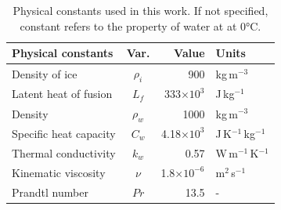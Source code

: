 \begin{table}[H]
\centering
\caption{Physical constants used in this work.  If not specified, constant refers to the property of water at at 0°C.}
\begin{tabular}{l c r l}
\hline
\textbf{Physical constants} & \textbf{Var.} & \textbf{Value} & \textbf{Units}\\
\hline
Density of ice &  $\rho_i$ & 900& kg\,m$^{-3}$ \\
Latent heat of fusion & $L_f$ & 333$\times10^3$ & J\,kg$^{-1}$\\
Density &  $\rho_w$ & 1000 & kg\,m$^{-3}$ \\
Specific heat capacity & $C_w$ & 4.18$\times10^3$ & J\,K$^{-1}$\,kg$^{-1}$\\
Thermal conductivity & $k_w$ & 0.57 & W\,m$^{-1}$\,K$^{-1}$\\
Kinematic viscosity  & $\nu$ & 1.8$\times10^{-6}$ & m$^2$\,s$^{-1}$\\
Prandtl number & $Pr$ & 13.5 & -\\

\hline
\end{tabular}
\label{table physical constants}
\end{table}



